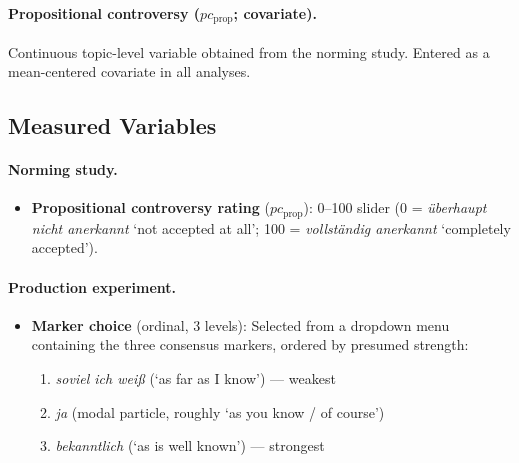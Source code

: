 \documentclass[12pt]{article}
\begin{document}
\paragraph{Propositional controversy ($pc_{\text{prop}}$; covariate).}
Continuous topic-level variable obtained from the norming study. Entered as a mean-centered covariate in all analyses.

\subsection{Measured Variables}

\paragraph{Norming study.}
\begin{itemize}
    \item \textbf{Propositional controversy rating} ($pc_{\text{prop}}$): 0--100 slider (0 = \textit{\"uberhaupt nicht anerkannt} `not accepted at all'; 100 = \textit{vollst\"andig anerkannt} `completely accepted').
\end{itemize}

\paragraph{Production experiment.}
\begin{itemize}
    \item \textbf{Marker choice} (ordinal, 3 levels): Selected from a dropdown menu containing the three consensus markers, ordered by presumed strength:
    \begin{enumerate}
        \item \textit{soviel ich wei\ss} (`as far as I know') --- weakest
        \item \textit{ja} (modal particle, roughly `as you know / of course')
        \item \textit{bekanntlich} (`as is well known') --- strongest
    \end{enumerate}
\end{itemize}
\end{document}
